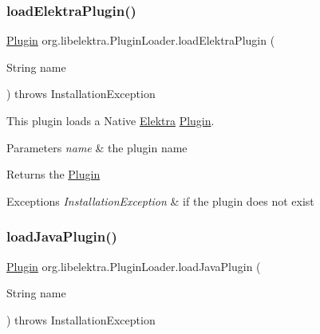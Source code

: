 \subsubsection{\texorpdfstring{loadElektraPlugin()}{loadElektraPlugin()}}
{\footnotesize\ttfamily \mbox{\hyperlink{interfaceorg_1_1libelektra_1_1Plugin}{Plugin}} org.\+libelektra.\+Plugin\+Loader.\+load\+Elektra\+Plugin (\begin{DoxyParamCaption}\item[{String}]{name }\end{DoxyParamCaption}) throws Installation\+Exception\hspace{0.3cm}{\ttfamily [inline]}}



This plugin loads a Native \mbox{\hyperlink{interfaceorg_1_1libelektra_1_1Elektra}{Elektra}} \mbox{\hyperlink{interfaceorg_1_1libelektra_1_1Plugin}{Plugin}}. 


\begin{DoxyParams}{Parameters}
{\em name} & the plugin name \\
\hline
\end{DoxyParams}
\begin{DoxyReturn}{Returns}
the \mbox{\hyperlink{interfaceorg_1_1libelektra_1_1Plugin}{Plugin}} 
\end{DoxyReturn}

\begin{DoxyExceptions}{Exceptions}
{\em Installation\+Exception} & if the plugin does not exist \\
\hline
\end{DoxyExceptions}
\mbox{\label{classorg_1_1libelektra_1_1PluginLoader_af0eac085b1b966aaabfda24ad0836f43}} 
\subsubsection{\texorpdfstring{loadJavaPlugin()}{loadJavaPlugin()}}
{\footnotesize\ttfamily \mbox{\hyperlink{interfaceorg_1_1libelektra_1_1Plugin}{Plugin}} org.\+libelektra.\+Plugin\+Loader.\+load\+Java\+Plugin (\begin{DoxyParamCaption}\item[{String}]{name }\end{DoxyParamCaption}) throws Installation\+Exception\hspace{0.3cm}{\ttfamily [inline]}}



